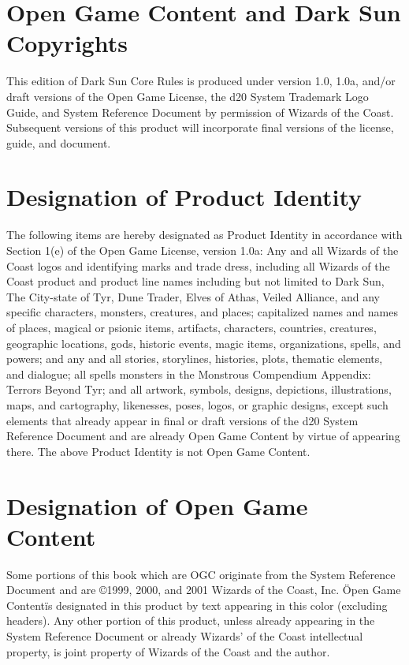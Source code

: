 \documentclass{report}
\begin{document}
\section*{Open Game Content and Dark Sun Copyrights}
This edition of Dark Sun Core Rules is produced under version 1.0, 1.0a, and/or draft versions of the Open Game License, the d20 System Trademark Logo Guide, and System Reference Document by permission of Wizards of the Coast. Subsequent versions of this product will incorporate final versions of the license, guide, and document.

\section*{Designation of Product Identity}
The following items are hereby designated as Product Identity in accordance with Section 1(e) of the Open Game License, version 1.0a: Any and all Wizards of the Coast logos and identifying marks and trade dress, including all Wizards of the Coast product and product line names including but not limited to Dark Sun, The City-state of Tyr, Dune Trader, Elves of Athas, Veiled Alliance, and any specific characters, monsters, creatures, and places; capitalized names and names of places, magical or psionic items, artifacts, characters, countries, creatures, geographic locations, gods, historic events, magic items, organizations, spells, and powers; and any and all stories, storylines, histories, plots, thematic elements, and dialogue; all spells monsters in the Monstrous Compendium Appendix: Terrors Beyond Tyr; and all artwork, symbols, designs, depictions, illustrations, maps, and cartography, likenesses, poses, logos, or graphic designs, except such elements that already appear in final or draft versions of the d20 System Reference Document and are already Open Game Content by virtue of appearing there. The above Product Identity is not Open Game Content.

\section*{Designation of Open Game Content}
Some portions of this book which are OGC originate from the System Reference Document and are ©1999, 2000, and 2001 Wizards of the Coast, Inc. \"Open Game Content\" is designated in this product by text appearing in this color (excluding headers). Any other portion of this product, unless already appearing in the System Reference Document or already Wizards' of the Coast intellectual property, is joint property of Wizards of the Coast and the author.
\end{document}
